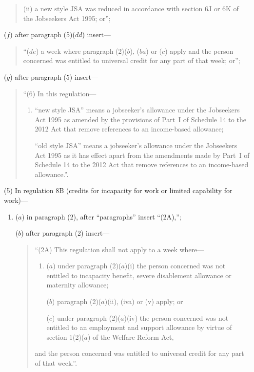 \documentclass[12pt,a4paper]{article}
\begin{document}
\begin{enumerate}
\begin{quotation}
\begin{enumerate}
(ii) a new style JSA was reduced in accordance with section 6J or 6K of the Jobseekers Act 1995; or”;
\end{enumerate}
\end{quotation}

($f$) after paragraph (5)($dd$)  insert—
\begin{quotation}
“($de$) a week where paragraph (2)($b$), ($ba$)  or ($c$)  apply and the person concerned was entitled to universal credit for any part of that week; or”;
\end{quotation}

($g$) after paragraph (5) insert—
\begin{quotation}
“(6) In this regulation—
\begin{enumerate}\item[]
“new style JSA” means a jobseeker’s allowance under the Jobseekers Act 1995 as amended by the provisions of Part~I of Schedule 14 to the 2012 Act that remove references to an income-based allowance;

“old style JSA” means a jobseeker’s allowance under the Jobseekers Act 1995 as it has effect apart from the amendments made by Part~I of Schedule 14 to the 2012 Act that remove references to an income-based allowance.”.
\end{enumerate}
\end{quotation}
\end{enumerate}

(5) In regulation 8B (credits for incapacity for work or limited capability for work)—
\begin{enumerate}\item[]
($a$) in paragraph (2), after “paragraphs” insert “(2A),”;

($b$) after paragraph (2) insert—
\begin{quotation}
“(2A) This regulation shall not apply to a week where—
\begin{enumerate}\item[]
($a$) under paragraph (2)($a$)(i)  the person concerned was not entitled to incapacity benefit, severe disablement allowance or maternity allowance;

($b$) paragraph (2)($a$)(ii), (iva) or (v)  apply; or

($c$) under paragraph (2)($a$)(iv)  the person concerned was not entitled to an employment and support allowance by virtue of section 1(2)($a$)  of the Welfare Reform Act,
\end{enumerate}
and the person concerned was entitled to universal credit for any part of that week.”.
\end{quotation}
\end{enumerate}
\end{document}
